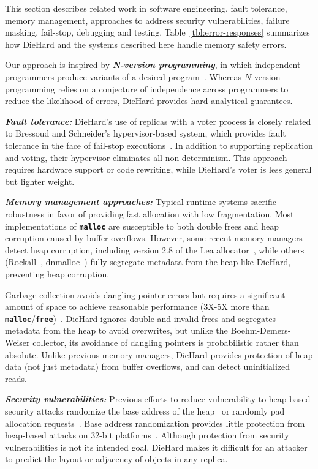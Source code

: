\documentclass{sig-alternate}
\newcommand{\cfunction}[1]{{\bf \tt #1}}
\newcommand{\malloc}{\cfunction{malloc}}
\newcommand{\free}{\cfunction{free}}
\begin{document}
\noindent
This section describes related work in software engineering, fault
tolerance, memory management, approaches to address security
vulnerabilities, failure masking, fail-stop, debugging and
testing. Table~\ref{tbl:error-responses} summarizes how DieHard and
the systems described here handle memory safety errors.

Our approach is inspired by {\bf \em N-version programming}, in which
independent programmers produce variants of a desired
program~\cite{Avizienis:TOSE85}. Whereas $N$-version programming
relies on a conjecture of independence across programmers to reduce
the likelihood of errors, DieHard provides hard analytical guarantees.

{\bf \em Fault tolerance:} DieHard's use of replicas with a voter
process is closely related to Bressoud and Schneider's
hypervisor-based system, which provides fault tolerance in
the face of fail-stop executions~\cite{224058}. In addition to
supporting replication and voting, their hypervisor eliminates all
non-determinism. This approach requires hardware support or code
rewriting, while DieHard's voter is less general but lighter weight.

{\bf \em Memory management approaches:} Typical runtime systems
sacrific robustness in favor of providing fast allocation with low
fragmentation. Most implementations of \malloc{} are susceptible to
both double frees and heap corruption caused by buffer
overflows. However, some recent memory managers detect heap
corruption, including version 2.8 of the Lea
allocator~\cite{lea97,robertson03}, while others
(Rockall~\cite{ball01parameterized}, dnmalloc~\cite{youn05}) fully
segregate metadata from the heap like DieHard, preventing heap
corruption.

Garbage collection avoids dangling pointer errors but requires a
significant amount of space to achieve reasonable performance (3X-5X
more than
\malloc{}/\free{})~\cite{hert05a,swamy05experience,zorn93}. DieHard
ignores double and invalid frees and segregates metadata from the heap
to avoid overwrites, but unlike the Boehm-Demers-Weiser collector, its
avoidance of dangling pointers is probabilistic rather than
absolute. Unlike previous memory managers, DieHard provides protection
of heap data (not just metadata) from buffer overflows, and can detect
uninitialized reads.


{\bf \em Security vulnerabilities:} Previous efforts to reduce
vulnerability to heap-based security attacks randomize the base
address of the heap~\cite{bhatkar03,paxaslr} or randomly pad
allocation requests~\cite{bhatkar05}. Base address randomization
provides little protection from heap-based attacks on 32-bit
platforms~\cite{1030124}. Although protection from security
vulnerabilities is not its intended goal, DieHard makes it difficult
for an attacker to predict the layout or adjacency of objects in any
replica.
\end{document}
